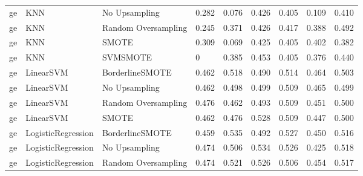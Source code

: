\begin{tabular}{lllllllll}
      ge &                          KNN &       No Upsampling & 0.282 &                     0.076 &                 0.426 &                  0.405 &                                   0.109 &     0.410 \\
      ge &                          KNN & Random Oversampling & 0.245 &                     0.371 &                 0.426 &                  0.417 &                                   0.388 &     0.492 \\
      ge &                          KNN &               SMOTE & 0.309 &                     0.069 &                 0.425 &                  0.405 &                                   0.402 &     0.382 \\
      ge &                          KNN &            SVMSMOTE &     0 &                     0.385 &                 0.453 &                  0.405 &                                   0.376 &     0.440 \\
      ge &                    LinearSVM &     BorderlineSMOTE & 0.462 &                     0.518 &                 0.490 &                  0.514 &                                   0.464 &     0.503 \\
      ge &                    LinearSVM &       No Upsampling & 0.462 &                     0.498 &                 0.499 &                  0.509 &                                   0.465 &     0.499 \\
      ge &                    LinearSVM & Random Oversampling & 0.476 &                     0.462 &                 0.493 &                  0.509 &                                   0.451 &     0.500 \\
      ge &                    LinearSVM &               SMOTE & 0.462 &                     0.476 &                 0.528 &                  0.509 &                                   0.447 &     0.500 \\
      ge &           LogisticRegression &     BorderlineSMOTE & 0.459 &                     0.535 &                 0.492 &                  0.527 &                                   0.450 &     0.516 \\
      ge &           LogisticRegression &       No Upsampling & 0.474 &                     0.506 &                 0.534 &                  0.526 &                                   0.425 &     0.518 \\
      ge &           LogisticRegression & Random Oversampling & 0.474 &                     0.521 &                 0.526 &                  0.506 &                                   0.454 &     0.517 \\

\end{tabular}
